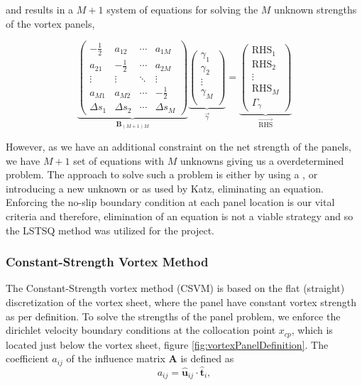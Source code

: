and results in a $M+1$ system of equations for solving the $M$ unknown strengths of the vortex panels,

	\begin{equation}
	\underbrace{\begin{pmatrix}
	-\frac{1}{2} & a_{12} & \cdots & a_{1M}\\ 
	a_{21} & -\frac{1}{2} & \cdots & a_{2M}\\
	\vdots & \vdots & \ddots & \vdots\\ 
	a_{M1} & a_{M2} & \cdots & -\frac{1}{2}\\
	\Delta s_1 & \Delta s_2 & \cdots & \Delta s_M
	\end{pmatrix}}_{\mathbf{B}_{\left(M+1\right)M}} \underbrace{\begin{pmatrix}
	\gamma_{1}\\ \gamma_{2}\\
	\vdots\\
	\gamma_M\\
	\end{pmatrix}}_{\vec{\gamma}} = \underbrace{\begin{pmatrix}
	\mathrm{RHS}_1\\ 
	\mathrm{RHS}_2\\ 
	\vdots\\
	\mathrm{RHS}_M\\
	\Gamma_{\gamma}
	\end{pmatrix}}_{\overrightarrow{\mathrm{RHS}}}
	\end{equation}

However, as we have an additional constraint on the net strength of the panels, we have $M+1$ set of equations with $M$ unknowns giving us a overdetermined problem. The approach to solve such a problem is either by using a , or introducing a new unknown or as used by Katz, eliminating an equation. Enforcing the no-slip boundary condition at each panel location is our vital criteria and therefore, elimination of an equation is not a viable strategy and so the LSTSQ method was utilized for the project.

\subsubsection{Constant-Strength Vortex Method}

The Constant-Strength vortex method ({\color{darkblue}CSVM}) is based on the flat (straight) discretization of the vortex sheet, where the panel have constant vortex strength as per definition. To solve the strengths of the panel problem, we enforce the dirichlet velocity boundary conditions at the collocation point $x_{cp}$, which is located just below the vortex sheet, figure \ref{fig:vortexPanelDefinition}. The coefficient $a_{ij}$ of the influence matrix $\mathbf{A}$ is defined as
	\begin{equation}
	a_{ij} = \mathbf{\hat{u}}_{ij} \cdot \mathbf{\hat{t}}_i,
	\end{equation}
		
